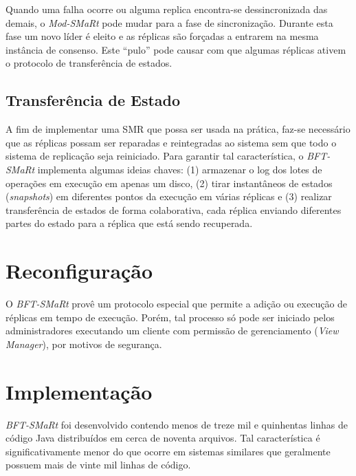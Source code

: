 		Quando uma falha ocorre ou alguma replica encontra-se dessincronizada das demais, o \textit{Mod-SMaRt} pode mudar para a fase de sincronização. Durante esta fase um novo líder é eleito e as réplicas são forçadas a entrarem na mesma instância de consenso. Este “pulo” pode causar com que algumas réplicas ativem o protocolo de transferência de estados.\\
		
		\subsection{Transferência de Estado}
		A fim de implementar uma SMR que possa ser usada na prática, faz-se necessário que as réplicas possam ser reparadas e reintegradas ao sistema sem que todo o sistema de replicação seja reiniciado. Para garantir tal característica, o \textit{BFT-SMaRt} implementa algumas ideias chaves: (1) armazenar o log dos lotes de operações em execução em apenas um disco, (2) tirar instantâneos de estados (\textit{snapshots}) em diferentes pontos da execução em várias réplicas e (3) realizar transferência de estados de forma colaborativa, cada réplica enviando diferentes partes do estado para a réplica que está sendo recuperada.\\
	
	\section{Reconfiguração}
	O \textit{BFT-SMaRt} provê um protocolo especial que permite a adição ou execução de réplicas em tempo de execução. Porém, tal processo só pode ser iniciado pelos administradores executando um cliente com permissão de gerenciamento (\textit{View Manager}), por motivos de segurança.\\
	
	\section{Implementação}
	\textit{BFT-SMaRt} foi desenvolvido contendo menos de treze mil e quinhentas linhas de código Java distribuídos em cerca de noventa arquivos. Tal característica é significativamente menor do que ocorre em sistemas similares que geralmente possuem mais de vinte mil linhas de código. \\
	
